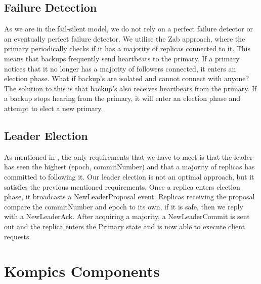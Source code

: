 \documentclass[12pt]{article}
\begin{document}
\subsection{Failure Detection}
As we are in the fail-silent model, we do not rely on a perfect failure detector or an eventually perfect failure detector. We utilise the Zab approach, where the primary periodically checks if it has a majority of replicas connected to it. This means that backups frequently send heartbeats to the primary. If a primary notices that it no longer has a majority of followers connected, it enters an election phase. What if backup’s are isolated and cannot connect with anyone? The solution to this is that backup’s also receives heartbeats from the primary. If a backup stops hearing from the primary, it will enter an election phase and attempt to elect a new primary.

\subsection{Leader Election}
As mentioned in \cite{zk-internals}, the only requirements that we have to meet is that the leader has seen the highest (epoch, commitNumber) and that a majority of replicas has committed to following it. Our leader election is not an optimal approach, but it satisfies the previous mentioned requirements. Once a replica enters election phase, it broadcasts a NewLeaderProposal event. Replicas receiving the proposal compare the commitNumber and epoch to its own, if it is safe, then we reply with a NewLeaderAck. After acquiring a majority, a NewLeaderCommit is sent out and the replica enters the Primary state and is now able to execute client requests.

\section{Kompics Components}
\end{document}
